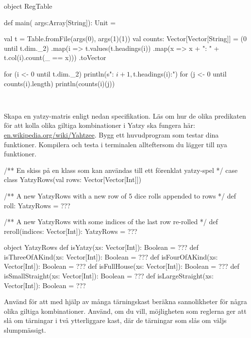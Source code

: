 \SubtaskSolved  \begin{CodeSmall}
object RegTable {
 	def main( args:Array[String]): Unit = {
		val t = Table.fromFile(args(0), args(1)(1))
		val counts: Vector[Vector[String]] =
 			(0 until t.dim._2)
				.map(i => t.values(t.headings(i))
				.map(x => x + ": " + t.col(i).count(_ == x)))
				.toVector

    for (i <- 0 until t.dim._2) {
      println(s"\nColumn: ${i + 1}, ${t.headings(i)}:")
      for (j <- 0 until counts(i).length) {
        println(counts(i)(j))
      }
    }
  }
}
\end{CodeSmall}

\QUESTEND





\QUESTBEGIN

\Task  \what~

\Subtask Skapa en yatzy-matris enligt nedan specifikation. Läs om hur de olika predikaten för att kolla olika giltiga kombinationer i Yatzy ska fungera här: \href{https://en.wikipedia.org/wiki/Yahtzee}{en.wikipedia.org/wiki/Yahtzee}. Bygg ett huvudprogram som testar dina funktioner. Kompilera och testa i terminalen allteftersom du lägger till nya funktioner.

\begin{CodeSmall}
/** En skiss på en klass som kan användas till ett förenklat yatzy-spel */
case class YatzyRows(val rows: Vector[Vector[Int]]) {
  /** A new YatzyRows with a new row of 5 dice rolls appended to rows  */
  def roll: YatzyRows = ???

  /** A new YatzyRows with some indices of the last row re-rolled  */
  def reroll(indices: Vector[Int]): YatzyRows = ???
}

object YatzyRows {
  def isYatzy(xs: Vector[Int]): Boolean = ???
  def isThreeOfAKind(xs: Vector[Int]): Boolean = ???
  def isFourOfAKind(xs: Vector[Int]): Boolean = ???
  def isFullHouse(xs: Vector[Int]): Boolean = ???
  def isSmallStraight(xs: Vector[Int]): Boolean = ???
  def isLargeStraight(xs: Vector[Int]): Boolean = ???
}
\end{CodeSmall}


\Subtask Använd  för att med hjälp av många tärningskast beräkna sannolikheter för några olika giltiga kombinationer. Använd, om du vill, möjligheten som reglerna ger att slå om tärningar i två ytterliggare kast, där de tärningar som slås om väljs slumpmässigt.


